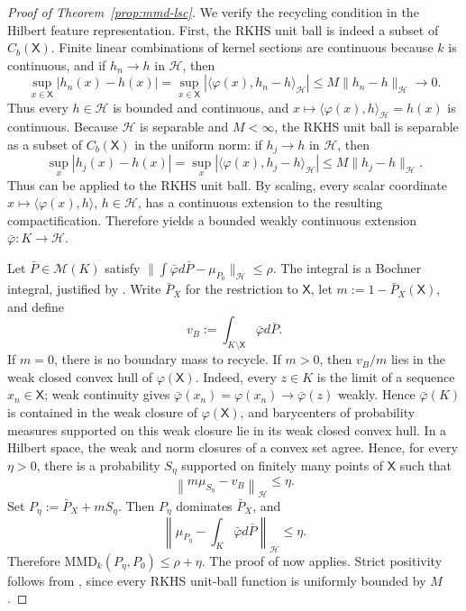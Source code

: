 \documentclass[11pt]{article}
\newcommand{\MMD}{\mathrm{MMD}}
\newcommand{\X}{\mathsf{X}}
\newcommand{\M}{\mathcal{M}}
\newcommand{\dd}{d}
\theoremstyle{definition}
\theoremstyle{definition}
\begin{document}
\begin{proof}[Proof of Theorem~\ref{prop:mmd-lsc}]
We verify the recycling condition in the Hilbert feature representation.  First, the RKHS unit ball is indeed a subset of \(C_b(\X)\).  Finite linear combinations of kernel sections are continuous because \(k\) is continuous, and if \(h_n\to h\) in \(\mathcal H\), then
\[
  \sup_{x\in\X}|h_n(x)-h(x)|
  =\sup_{x\in\X}|\langle\varphi(x),h_n-h\rangle_{\mathcal H}|
  \le M\|h_n-h\|_{\mathcal H}\to0.
\]
Thus every \(h\in\mathcal H\) is bounded and continuous, and \(x\mapsto\langle\varphi(x),h\rangle_{\mathcal H}=h(x)\) is continuous.  Because \(\mathcal H\) is separable and \(M<\infty\), the RKHS unit ball is separable as a subset of \(C_b(\X)\) in the uniform norm: if \(h_j\to h\) in \(\mathcal H\), then
\[
  \sup_x|h_j(x)-h(x)|
  =\sup_x|\langle\varphi(x),h_j-h\rangle_{\mathcal H}|
  \le M\|h_j-h\|_{\mathcal H}.
\]
Thus  can be applied to the RKHS unit ball.  By scaling, every scalar coordinate \(x\mapsto\langle\varphi(x),h\rangle\), \(h\in\mathcal H\), has a continuous extension to the resulting compactification.  Therefore  yields a bounded weakly continuous extension \(\bar\varphi:K\to\mathcal H\).

Let \(\bar P\in\M(K)\) satisfy \(\|\int\bar\varphi\dd\bar P-\mu_{P_0}\|_{\mathcal H}\le\rho\).  The integral is a Bochner integral, justified by .  Write \(\bar P_X\) for the restriction to \(\X\), let \(m:=1-\bar P_X(\X)\), and define
\[
  v_B:=\int_{K\setminus\X}\bar\varphi\dd\bar P.
\]
If \(m=0\), there is no boundary mass to recycle.  If \(m>0\), then \(v_B/m\) lies in the weak closed convex hull of \(\varphi(\X)\).  Indeed, every \(z\in K\) is the limit of a sequence \(x_n\in\X\); weak continuity gives \(\bar\varphi(x_n)=\varphi(x_n)\to\bar\varphi(z)\) weakly.  Hence \(\bar\varphi(K)\) is contained in the weak closure of \(\varphi(\X)\), and barycenters of probability measures supported on this weak closure lie in its weak closed convex hull.  In a Hilbert space, the weak and norm closures of a convex set agree.  Hence, for every \(\eta>0\), there is a probability \(S_\eta\) supported on finitely many points of \(\X\) such that
\[
  \left\|m\mu_{S_\eta}-v_B\right\|_{\mathcal H}\le\eta.
\]
Set \(P_\eta:=\bar P_X+mS_\eta\).  Then \(P_\eta\) dominates \(\bar P_X\), and
\[
  \left\|\mu_{P_\eta}-\int_K\bar\varphi\dd\bar P\right\|_{\mathcal H}\le\eta.
\]
Therefore \(\MMD_k(P_\eta,P_0)\le\rho+\eta\).  The proof of  now applies.  Strict positivity follows from , since every RKHS unit-ball function is uniformly bounded by \(M\).
\end{proof}
\end{document}
